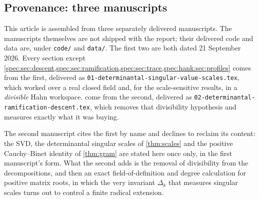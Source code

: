 \documentclass[11pt,a4paper]{article}
\numberwithin{equation}{section}
\theoremstyle{definition}
\theoremstyle{remark}
\begin{document}
\subsection{Provenance: three manuscripts}
\label{spec:sec:provenance}
This article is assembled from three separately delivered manuscripts. The
manuscripts themselves are not shipped with the report; their delivered code
and data are, under \texttt{code/} and \texttt{data/}. The first two are both
dated 21 September 2026. Every section except
\cref{spec:sec:descent,spec:sec:ramification,spec:sec:trace,spec:hank:sec:profiles}
comes from the first, delivered as
\nolinkurl{01-determinantal-singular-value-scales.tex}, which worked over a real
closed field and, for the scale-sensitive results, in a \emph{divisible} Hahn
workspace.  come
from the second, delivered as
\nolinkurl{02-determinantal-ramification-descent.tex}, which removes that
divisibility hypothesis and measures exactly what it was buying.

The second manuscript cites the first by name and declines to reclaim its
content: the SVD, the determinantal singular scales of \cref{thm:scales} and
the positive Cauchy--Binet identity of \cref{thm:gram} are stated here once
only, in the first manuscript's form. What the second adds is the removal of
divisibility from the decompositions, and then an exact field-of-definition
and degree calculation for positive matrix roots, in which the very invariant
$\Delta_k$ that measures singular scales turns out to control a finite
radical extension.
\end{document}
